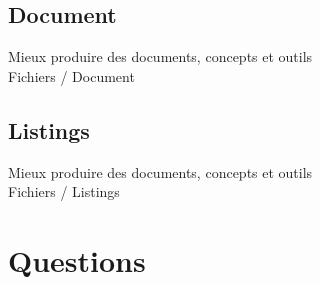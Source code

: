 \documentclass{beamer}
\def\hititle{Mieux produire des documents}
\def\lotitle{concepts et outils}
\def\fulltitle{\hititle, \lotitle}
\begin{document}
\subsection{Document}
\begin{frame}{\fulltitle\\Fichiers / Document}

\end{frame}
\subsection{Listings}
\begin{frame}{\fulltitle\\Fichiers / Listings}

\end{frame}
\section{Questions}
\end{document}
